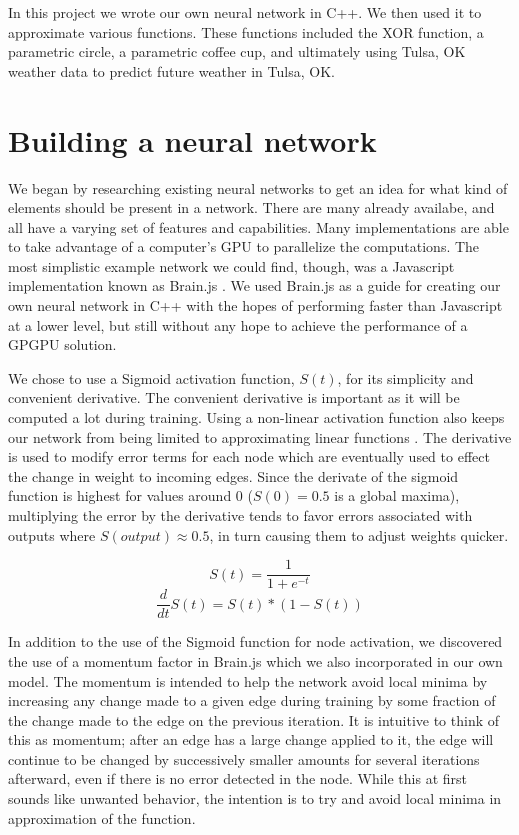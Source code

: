 \documentclass{article}
\begin{document}
\begin{multicols}{2}
In this project we wrote our own neural network in C++. We then used it to approximate various functions. These functions included the XOR function, a parametric circle, a parametric coffee cup, and ultimately using Tulsa, OK weather data to predict future weather in Tulsa, OK.

\section{Building a neural network}

We began by researching existing neural networks to get an idea for what kind of elements should be present in a network. There are many already availabe, and all have a varying set of features and capabilities. Many implementations are able to take advantage of a computer's GPU to parallelize the computations. The most simplistic example network we could find, though, was a Javascript implementation known as Brain.js \cite{brain}. We used Brain.js as a guide for creating our own neural network in C++ with the hopes of performing faster than Javascript at a lower level, but still without any hope to achieve the performance of a GPGPU solution.

We chose to use a Sigmoid activation function, $S(t)$, for its simplicity and convenient derivative. The convenient derivative is important as it will be computed a lot during training. Using a non-linear activation function also keeps our network from being limited to approximating linear functions \cite{hornik}. The derivative is used to modify error terms for each node which are eventually used to effect the change in weight to incoming edges. Since the derivate of the sigmoid function is highest for values around 0 ($S(0) = 0.5$ is a global maxima), multiplying the error by the derivative tends to favor errors associated with outputs where $S(output)\approx0.5$, in turn causing them to adjust weights quicker.

	\[S(t) = \frac{1}{1+e^{-t}}\]
	\[\frac{d}{dt}S(t) = S(t) * (1-S(t))\]

In addition to the use of the Sigmoid function for node activation, we discovered the use of a momentum factor in Brain.js which we also incorporated in our own model. The momentum is intended to help the network avoid local minima by increasing any change made to a given edge during training by some fraction of the change made to the edge on the previous iteration. It is intuitive to think of this as momentum; after an edge has a large change applied to it, the edge will continue to be changed by successively smaller amounts for several iterations afterward, even if there is no error detected in the node. While this at first sounds like unwanted behavior, the intention is to try and avoid local minima in approximation of the function.


\end{multicols}
\end{document}
